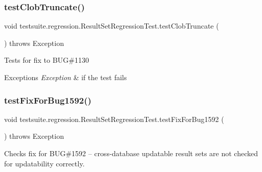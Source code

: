 \subsubsection{\texorpdfstring{test\+Clob\+Truncate()}{testClobTruncate()}}
{\footnotesize\ttfamily void testsuite.\+regression.\+Result\+Set\+Regression\+Test.\+test\+Clob\+Truncate (\begin{DoxyParamCaption}{ }\end{DoxyParamCaption}) throws Exception}

Tests for fix to B\+UG\#1130


\begin{DoxyExceptions}{Exceptions}
{\em Exception} & if the test fails \\
\hline
\end{DoxyExceptions}
\mbox{\label{classtestsuite_1_1regression_1_1_result_set_regression_test_af6f990a2b26f31cea60e13d460981d60}} 
\subsubsection{\texorpdfstring{test\+Fix\+For\+Bug1592()}{testFixForBug1592()}}
{\footnotesize\ttfamily void testsuite.\+regression.\+Result\+Set\+Regression\+Test.\+test\+Fix\+For\+Bug1592 (\begin{DoxyParamCaption}{ }\end{DoxyParamCaption}) throws Exception}

Checks fix for B\+UG\#1592 -- cross-\/database updatable result sets are not checked for updatability correctly.


